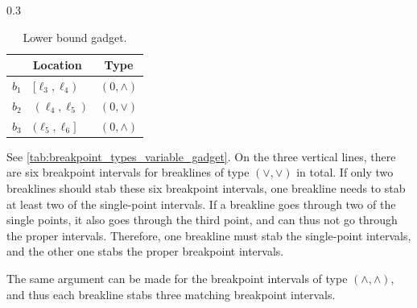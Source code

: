 \documentclass{toc}
\begin{document}
\begin{table}[htb]
    \hfill
    \begin{subtable}[b]{0.3\textwidth}
        \centering
        \begin{tabular}{llc}
            \toprule
            & Location & Type \\
            \midrule
            $b_1$ & $[\ell_3,\ell_4)$ & $(0,\wedge)$ \\
            $b_2$ & $(\ell_4,\ell_5)$ & $(0,\vee)$ \\
            $b_3$ & $(\ell_5,\ell_6]$ & $(0,\wedge)$ \\
            \bottomrule
        \end{tabular}
        \vspace{9.9mm}
        \caption{Lower bound gadget.}
        \label{tab:breakpoint_types_lower_bound_gadget}
    \end{subtable}
    \label{tab:breakpoint_types}
\end{table}


\begin{claimproof}
    See \cref{tab:breakpoint_types_variable_gadget}.
    On the three vertical lines, there are six breakpoint intervals for breaklines of type $(\vee,\vee)$ in total.
    If only two breaklines should stab these six breakpoint intervals, one breakline needs to stab at least two of the single-point intervals.
    If a breakline goes through two of the single points, it also goes through the third point, and can thus not go through the proper intervals.
    Therefore, one breakline must stab the single-point intervals, and the other one stabs the proper breakpoint intervals.

    The same argument can be made for the breakpoint intervals of type $(\wedge,\wedge)$, and thus each breakline stabs three matching breakpoint intervals.
\end{claimproof}

\end{document}
